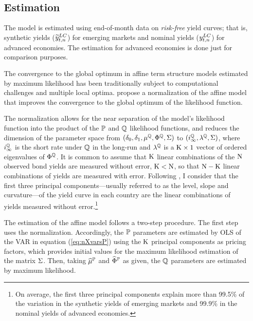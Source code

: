 {\subsection{Estimation} \label{sec:Estimation}
\iftoggle{toclinks}{\gototoc}{} %

The model is estimated using end-of-month data on \textit{risk-free} yield curves; that is, synthetic yields (\(\widetilde{y}_{t,n} ^{LC}\)) for emerging markets and nominal yields (\(y_{t,n} ^{LC}\)) for advanced economies. 
The estimation for advanced economies is done just for comparison purposes. 

The convergence to the global optimum in affine term structure models estimated by maximum likelihood has been traditionally subject to computational challenges and multiple local optima.
\cite{JSZ:2011} propose a normalization of the affine model that improves the convergence to the global optimum of the likelihood function.

The \cite{JSZ:2011} normalization allows for the near separation of the model's likelihood function into the product of the \(\mathbb{P}\) and \(\mathbb{Q}\) likelihood functions, and reduces the dimension of the parameter space from \((\delta_{0}, \delta_{1}, \mu^{\mathbb{Q}}, \Phi^{\mathbb{Q}}, \Sigma)\) to \((i^{\mathbb{Q}}_{\infty}, \lambda^{\mathbb{Q}},\Sigma)\), where \(i^{\mathbb{Q}}_{\infty}\) is the short rate under \(\mathbb{Q}\) in the long-run and \(\lambda^{\mathbb{Q}}\) is a \(\mathrm{K} \times 1\) vector of ordered eigenvalues of \(\Phi^{\mathbb{Q}}\).
It is common to assume that \(\mathrm{K}\) linear combinations of the \(\mathrm{N}\) observed bond yields are measured without error, \(\mathrm{K} < \mathrm{N}\), so that \(\mathrm{N} - \mathrm{K}\) linear combinations of yields are measured with error. 
Following \cite{JSZ:2011}, I consider that the first three principal components---usually referred to as the level, slope and curvature---of the yield curve in each country are the linear combinations of yields measured without error.\footnote{ On average, the first three principal components explain more than 99.5\% of the variation in the synthetic yields of emerging markets and 99.9\% in the nominal yields of advanced economies.} 

The estimation of the affine model follows a two-step procedure. 
The first step uses the \cite{JSZ:2011} normalization. Accordingly, the \(\mathbb{P}\) parameters are estimated by OLS of the VAR in equation (\ref{eq:nXvarsP}) using the \(\mathrm{K}\) principal components as pricing factors, which provides initial values for the maximum likelihood estimation of the matrix \(\Sigma\). Then, taking \(\widehat{\mu}^{\mathbb{P}}\) and \(\widehat{\Phi}^{\mathbb{P}}\) as given, the \(\mathbb{Q}\) parameters are estimated by maximum likelihood. 

}

